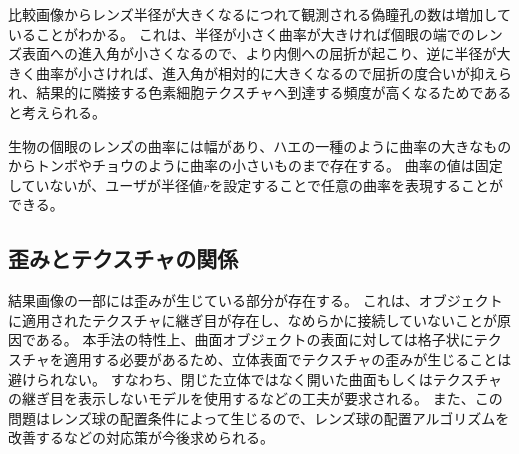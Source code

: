 比較画像からレンズ半径が大きくなるにつれて観測される偽瞳孔の数は増加していることがわかる。
これは、半径が小さく曲率が大きければ個眼の端でのレンズ表面への進入角が小さくなるので、より内側への屈折が起こり、逆に半径が大きく曲率が小さければ、進入角が相対的に大きくなるので屈折の度合いが抑えられ、結果的に隣接する色素細胞テクスチャへ到達する頻度が高くなるためであると考えられる。

生物の個眼のレンズの曲率には幅があり、ハエの一種のように曲率の大きなものからトンボやチョウのように曲率の小さいものまで存在する。
曲率の値は固定していないが、ユーザが半径値$r$を設定することで任意の曲率を表現することができる。



\subsection{歪みとテクスチャの関係}
\label{SSDistortion}

結果画像の一部には歪みが生じている部分が存在する。
これは、オブジェクトに適用されたテクスチャに継ぎ目が存在し、なめらかに接続していないことが原因である。
本手法の特性上、曲面オブジェクトの表面に対しては格子状にテクスチャを適用する必要があるため、立体表面でテクスチャの歪みが生じることは避けられない。
すなわち、閉じた立体ではなく開いた曲面もしくはテクスチャの継ぎ目を表示しないモデルを使用するなどの工夫が要求される。
また、この問題はレンズ球の配置条件によって生じるので、レンズ球の配置アルゴリズムを改善するなどの対応策が今後求められる。

